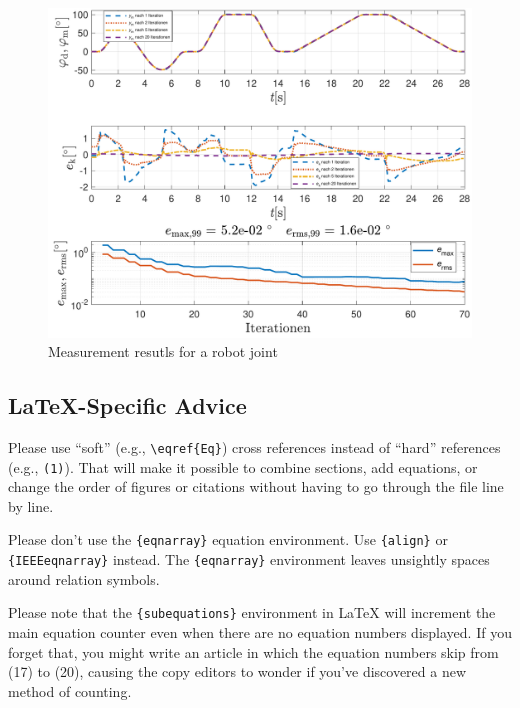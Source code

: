 \documentclass[conference]{IEEEtran}
\begin{document}
\begin{figure}[htbp]
\centerline{\includegraphics[scale=.7]{./pictures/dSpace_Messung_ILC_DR70_Shruti.pdf}}
\caption{Measurement resutls for a robot joint}
\label{fig:ILC70Shruti}
\end{figure}

\subsection{\LaTeX-Specific Advice}

Please use ``soft'' (e.g., \verb|\eqref{Eq}|) cross references instead
of ``hard'' references (e.g., \verb|(1)|). That will make it possible
to combine sections, add equations, or change the order of figures or
citations without having to go through the file line by line.

Please don't use the \verb|{eqnarray}| equation environment. Use
\verb|{align}| or \verb|{IEEEeqnarray}| instead. The \verb|{eqnarray}|
environment leaves unsightly spaces around relation symbols.

Please note that the \verb|{subequations}| environment in {\LaTeX}
will increment the main equation counter even when there are no
equation numbers displayed. If you forget that, you might write an
article in which the equation numbers skip from (17) to (20), causing
the copy editors to wonder if you've discovered a new method of
counting.
\end{document}
